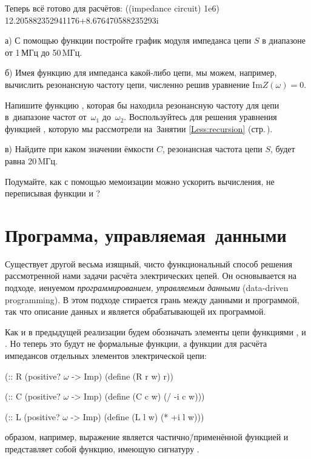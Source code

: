 Теперь всё готово для расчётов:
\REPL
  {((impedance circuit) 1e6)}
  {12.205882352941176+8.676470588235293i}

\begin{Assignment}
а) С помощью функции  постройте график модуля импеданса цепи $S$ в диапазоне от 1\,МГц до 50\,MГц.

б) Имея функцию для импеданса какой-либо цепи, мы можем, например, вычислить резонансную частоту цепи, численно решив уравнение $\mathrm{Im} Z(\omega) = 0$.

Напишите функцию , которая бы находила резонансную частоту для цепи  в~диапазоне частот от~$\omega_1$ до~$\omega_2$. Воспользуйтесь для решения уравнения функцией , которую мы рассмотрели на~Занятии \ref{Less:recursion}  (стр.\,\pageref{bisection}).

в) Найдите при каком значении ёмкости $C$, резонансная частота цепи $S$, будет равна 20\,MГц. 

Подумайте, как с помощью мемоизации можно ускорить вычисления, не переписывая функции  и ?
\end{Assignment}

\section{Программа, \mbox{управляемая данными}}%
Существует другой весьма изящный, чисто функциональный способ решения рассмотренной нами задачи расчёта электрических цепей. Он основывается на подходе, иенуемом \emph{программированием, управляемым данными} (data-driven programming). В этом подходе стирается грань между данными и программой, так что описание данных и является обрабатывающей их программой.

Как и в предыдущей реализации будем обозначать элементы цепи функциями ,  и . Но теперь это будут не формальные функции, а функции для расчёта импедансов отдельных элементов электрической цепи:
\begin{Definition}[emph={r,c,l,w}]
(:: R (positive? $\omega$ -> Imp)
  (define (R r w) r))

(:: C (positive? $\omega$ -> Imp)
  (define (C c w) (/ -i c w)))

(:: L (positive? $\omega$ -> Imp)
  (define (L l w) (* +i l w)))
\end{Definition}\newpage
{} образом, например, выражение  является частично\=/применённой функцией  и представляет собой функцию, имеющую сигнатуру .

